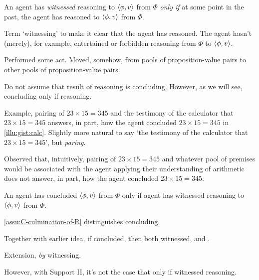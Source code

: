 \begin{note}
  \begin{definition}[Witnessing]
    An agent has \emph{witnessed} reasoning to \(\langle \phi, v \rangle\) from \(\Phi\) \emph{only if} at some point in the past, the agent has reasoned to \(\langle \phi, v \rangle\) from \(\Phi\).
  \end{definition}

  Term `witnessing' to make it clear that the agent has reasoned.
  The agent hasn't (merely), for example, entertained or forbidden reasoning from \(\Phi\) to \(\langle \phi, v \rangle\).

  Performed some act.
  Moved, somehow, from pools of proposition-value pairs to other pools of proposition-value pairs.

  Do not assume that result of reasoning is concluding.
  However, as we will see, concluding only if reasoning.
\end{note}

\begin{note}
  Example, pairing of \(23 \times 15 = 345\) and the testimony of the calculator that \(23 \times 15 = 345\) answers, in part, how the agent concluded \(23 \times 15 = 345\) in \autoref{illu:gist:calc}.
  Slightly more natural to say `the testimony of the calculator that \(23 \times 15 = 345\)', but \emph{paring}.

  Observed that, intuitively, pairing of \(23 \times 15 = 345\) and whatever pool of premises would be associated with the agent applying their understanding of arithmetic does not answer, in part, how the agent concluded \(23 \times 15 = 345\).
\end{note}

\begin{note}
  \begin{idea}
    \label{assu:C-culmination-of-R}
    An agent has concluded \(\langle \phi, v \rangle\) from \(\Phi\) only if agent has witnessed reasoning to \(\langle \phi, v \rangle\) from \(\Phi\).
  \end{idea}

  \autoref{assu:C-culmination-of-R} distinguishes concluding.

  Together with earlier idea, if concluded, then both witnessed, and \support{}.

  Extension, \support{} \emph{by} witnessing.

  However, with Support II, it's not the case that \support{} only if witnessed reasoning.
\end{note}


